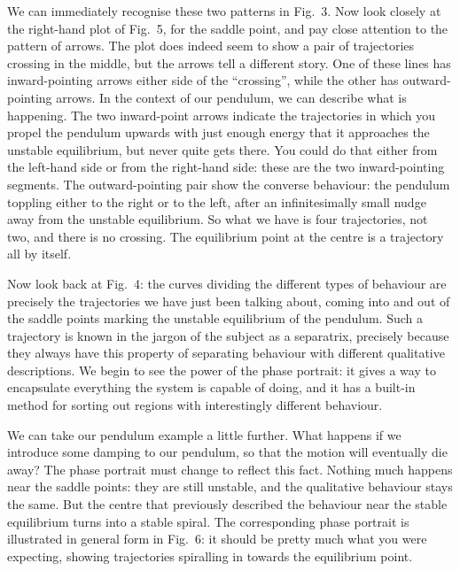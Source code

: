 

  We can immediately recognise these two patterns in Fig.\ 3. Now look closely 
  at the right-hand plot of Fig.\ 5, for the saddle point, and pay close 
  attention to the pattern of arrows. The plot does indeed seem to show a pair 
  of trajectories crossing in the middle, but the arrows tell a different 
  story. One of these lines has inward-pointing arrows either side of the 
  “crossing”, while the other has outward-pointing arrows. In the context of 
  our pendulum, we can describe what is happening. The two inward-point arrows 
  indicate the trajectories in which you propel the pendulum upwards with just 
  enough energy that it approaches the unstable equilibrium, but never quite 
  gets there. You could do that either from the left-hand side or from the 
  right-hand side: these are the two inward-pointing segments. The 
  outward-pointing pair show the converse behaviour: the pendulum toppling 
  either to the right or to the left, after an infinitesimally small nudge away 
  from the unstable equilibrium. So what we have is four trajectories, not two, 
  and there is no crossing. The equilibrium point at the centre is a trajectory 
  all by itself. 

  Now look back at Fig.\ 4: the curves dividing the different types of 
  behaviour are precisely the trajectories we have just been talking about, 
  coming into and out of the saddle points marking the unstable equilibrium of 
  the pendulum. Such a trajectory is known in the jargon of the subject as a 
  separatrix, precisely because they always have this property of separating 
  behaviour with different qualitative descriptions. We begin to see the power 
  of the phase portrait: it gives a way to encapsulate everything the system is 
  capable of doing, and it has a built-in method for sorting out regions with 
  interestingly different behaviour. 

  We can take our pendulum example a little further. What happens if we 
  introduce some damping to our pendulum, so that the motion will eventually 
  die away? The phase portrait must change to reflect this fact. Nothing much 
  happens near the saddle points: they are still unstable, and the qualitative 
  behaviour stays the same. But the centre that previously described the 
  behaviour near the stable equilibrium turns into a stable spiral. The 
  corresponding phase portrait is illustrated in general form in Fig.\ 6: it 
  should be pretty much what you were expecting, showing trajectories 
  spiralling in towards the equilibrium point. 

